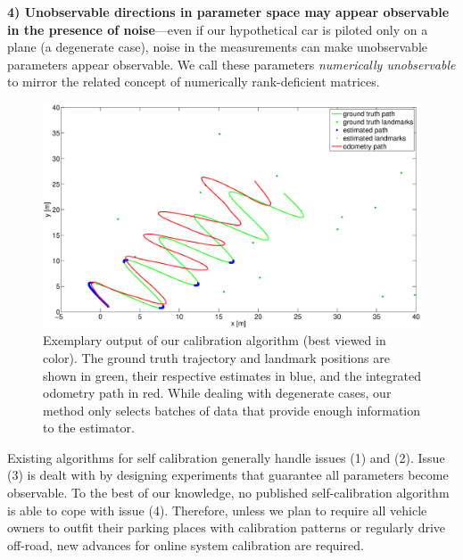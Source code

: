 {\bf 4) Unobservable directions in parameter space may appear observable in the
presence of noise}---even if our hypothetical car is piloted only on a plane (a
degenerate case), noise in the measurements can make unobservable parameters
appear observable. We call these parameters {\em numerically unobservable} to
mirror the related concept of numerically rank-deficient matrices.

\begin{figure}[t]
\centering
\includegraphics[width=\columnwidth]{fig/sin-path-result.eps}
\caption{Exemplary output of our calibration algorithm (best viewed in
  color). The ground truth trajectory and landmark positions are shown in green,
  their respective estimates in blue, and the integrated odometry path in red.
  While dealing with degenerate cases, our method only selects batches of data
  that provide enough information to the estimator.\vspace{-10pt}}
\label{fig:calib_demo}
\end{figure}

Existing algorithms for self calibration generally handle issues (1) and (2).
Issue (3) is dealt with by designing experiments that guarantee all parameters
become observable. To the best of our knowledge, no published self-calibration
algorithm is able to cope with issue (4). Therefore, unless we plan to require
all vehicle owners to outfit their parking places with calibration patterns or
regularly drive off-road, new advances for online system calibration are
required.

